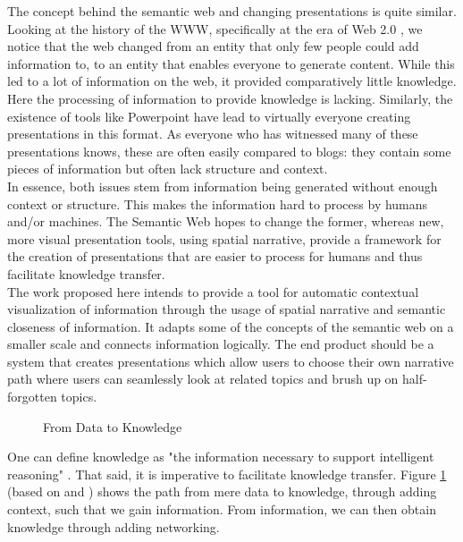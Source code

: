 \documentclass[twoside, 12pt]{article}
\begin{document}
The concept behind the semantic web and changing presentations is quite similar. Looking at the history of the WWW, specifically at the era of Web 2.0 \cite{Weller:npentrel14}, we notice that the web changed from an entity that only few people could add information to, to an entity that enables everyone to generate content. While this led to a lot of information on the web, it provided comparatively little knowledge. Here the processing of information to provide knowledge is lacking. Similarly, the existence of tools like Powerpoint have lead to virtually everyone creating presentations in this format. As everyone who has witnessed many of these presentations knows, these are often easily compared to blogs: they contain some pieces of information but often lack structure and context.\\

In essence, both issues stem from information being generated without enough context or structure. This makes the information hard to process by humans and/or machines. The Semantic Web hopes to change the former, whereas new, more visual presentation tools, using spatial narrative, provide a framework for the creation of presentations that are easier to process for humans and thus facilitate knowledge transfer.\\

The work proposed here intends to provide a tool for automatic contextual visualization of information through the usage of spatial narrative and semantic closeness of information. It adapts some of the concepts of the semantic web on a smaller scale and connects information logically. The end product should be a system that creates presentations which allow users to choose their own narrative path where users can seamlessly look at related topics and brush up on half-forgotten topics.\\

\begin{figure}[H]
        \centering
                \caption{From Data to Knowledge}
                \label{fig:dataknow}
\end{figure}

One can define knowledge as "the information necessary to support intelligent reasoning" \cite{Kohlhase:Complog:base}. That said, it is imperative to facilitate knowledge transfer. Figure \ref{fig:dataknow} (based on \cite{ProbstRaubRomhardt} and \cite{Kohlhase:Complog:base}) shows the path from mere data to knowledge, through adding context, such that we gain information. From information, we can then obtain knowledge through adding networking.\\
\end{document}
